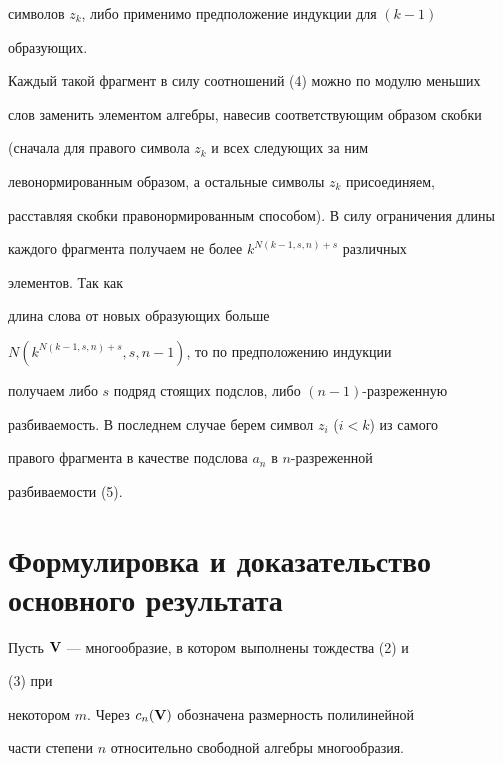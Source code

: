 \begin{pf}
символов $z_k$, либо применимо предположение индукции для $(k-1)$


образующих.


Каждый такой фрагмент в силу соотношений (4) можно по модулю меньших


слов заменить элементом алгебры, навесив соответствующим образом скобки


(сначала для правого символа $z_k$ и всех следующих за ним


левонормированным образом, а остальные символы $z_k$ присоединяем,


расставляя скобки правонормированным способом). В силу ограничения длины


каждого фрагмента получаем не более $k^{N(k-1,s,n)+s}$ различных


элементов. Так как


длина слова от новых образующих больше


$N(k^{N(k-1,s,n)+s},s,n-1)$, то по предположению индукции


получаем либо $s$ подряд стоящих подслов, либо $(n-1)$-разреженную


разбиваемость. В последнем случае берем символ $z_i$ ($i<k$) из самого


правого фрагмента в качестве подслова $a_n$ в $n$-разреженной


разбиваемости (5).


\end{pf}





\section{Формулировка и доказательство основного результата}





Пусть $\bold V$ --- многообразие, в котором выполнены тождества (2) и


(3) при


некотором $m$. Через $c_n(\bold V)$ обозначена размерность полилинейной


части степени $n$ относительно свободной алгебры многообразия.






